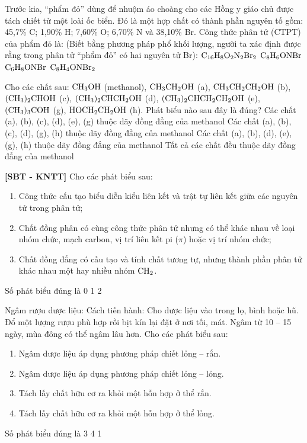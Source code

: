 \documentclass[12pt,a4paper]{article}
\begin{document}
\begin{ex}
Trước kia, ``phẩm đỏ'' dùng để nhuộm áo choàng cho các Hồng y giáo chủ được tách chiết từ một loài ốc biển. Đó là một hợp chất có thành phần nguyên tố gồm: 45,7\% C; 1,90\% H; 7,60\% O; 6,70\% N và 38,10\% Br. Công thức phân tử (CTPT) của phẩm đỏ là: (Biết bằng phương pháp phổ khối lượng, người ta xác định được rằng trong phân tử ``phẩm đỏ'' có hai nguyên tử Br):
\choice
{\True $\ce{C16H8O2N2Br2}$}
{$\ce{C8H6ONBr}$}
{$\ce{C6H8ONBr}$}
{$\ce{C8H4ONBr2}$}

\end{ex}

\begin{ex}
Cho các chất sau: $\ce{CH3OH}$ (methanol), $\ce{CH3CH2OH}$ (a), $\ce{CH3CH2CH2OH}$ (b), $\ce{(CH3)2CHOH}$ (c), $\ce{(CH3)2CHCH2OH}$ (d), $\ce{(CH3)2CHCH2CH2OH}$ (e), $\ce{(CH3)3COH}$ (g), $\ce{HOCH2CH2OH}$ (h). Phát biểu nào sau đây là đúng?
\choice
{\True Các chất (a), (b), (c), (d), (e), (g) thuộc dãy đồng đẳng của methanol}
{Các chất (a), (b), (c), (d), (g), (h) thuộc dãy đồng đẳng của methanol}
{Các chất (a), (b), (d), (e), (g), (h) thuộc dãy đồng đẳng của methanol}
{Tất cả các chất đều thuộc dãy đồng đẳng của methanol}

\end{ex}

\begin{ex}
\textbf{[SBT - KNTT]} Cho các phát biểu sau:
\begin{enumerate}[(1)]
	\item Công thức cấu tạo biểu diễn kiểu liên kết và trật tự liên kết giữa các nguyên tử trong phân tử;
	\item Chất đồng phân có cùng công thức phân tử nhưng có thể khác nhau về loại nhóm chức, mạch carbon, vị trí liên kết pi ($\pi$) hoặc vị trí nhóm chức;
	\item Chất đồng đẳng có cấu tạo và tính chất tương tự, nhưng thành phần phân tử khác nhau một hay nhiều nhóm $\ce{CH2}$.
\end{enumerate}
Số phát biểu đúng là
\choice
{0}
{1}
{2}
{}

\end{ex}

\begin{ex}
Ngâm rượu dược liệu: Cách tiến hành: Cho dược liệu vào trong lọ, bình hoặc hũ. Đổ một lượng rượu phù hợp rồi bịt kín lại đặt ở nơi tối, mát. Ngâm từ 10 -- 15 ngày, mùa đông có thể ngâm lâu hơn. Cho các phát biểu sau:
\begin{enumerate}[(1)]
	\item Ngâm dược liệu áp dụng phương pháp chiết lỏng -- rắn.
	\item Ngâm dược liệu áp dụng phương pháp chiết lỏng -- lỏng.
	\item Tách lấy chất hữu cơ ra khỏi một hỗn hợp ở thể rắn.
	\item Tách lấy chất hữu cơ ra khỏi một hỗn hợp ở thể lỏng.
\end{enumerate}
Số phát biểu đúng là
\choice
{}
{3}
{4}
{1}

\end{ex}
\end{document}
